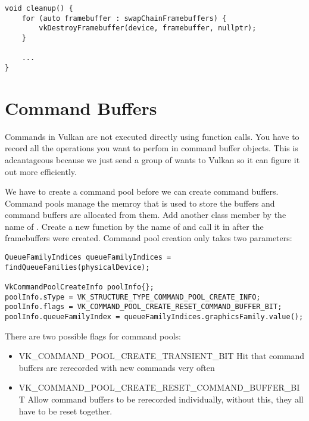  \begin{center}
\begin{minipage}{0.95\linewidth}
\begin{lstlisting}
void cleanup() {
    for (auto framebuffer : swapChainFramebuffers) {
        vkDestroyFramebuffer(device, framebuffer, nullptr);
    }

    ...
}
\end{lstlisting}
\end{minipage}
\end{center}

\section*{Command Buffers}

\par Commands in Vulkan are not executed directly using function calls. You have to record all the operations you want to perfom in command buffer objects. This is adcantageous because we just send a group of wants to Vulkan so it can figure it out more efficiently.

\par We have to create a command pool before we can create command buffers. Command pools manage the memroy that is used to store the buffers and command buffers are allocated from them. Add another class member by the name of . Create a new function by the name of  and call it in  after the framebuffers were created. Command pool creation only takes two parameters:

\begin{center}
\begin{minipage}{0.95\linewidth}
\begin{lstlisting}
QueueFamilyIndices queueFamilyIndices = findQueueFamilies(physicalDevice);

VkCommandPoolCreateInfo poolInfo{};
poolInfo.sType = VK_STRUCTURE_TYPE_COMMAND_POOL_CREATE_INFO;
poolInfo.flags = VK_COMMAND_POOL_CREATE_RESET_COMMAND_BUFFER_BIT;
poolInfo.queueFamilyIndex = queueFamilyIndices.graphicsFamily.value();
\end{lstlisting}
\end{minipage}
\end{center}

\par There are two possible flags for command pools:

\begin{itemize}
\item {VK\_COMMAND\_POOL\_CREATE\_TRANSIENT\_BIT} Hit that command buffers are rerecorded with new commands very often
\item {VK\_COMMAND\_POOL\_CREATE\_RESET\_COMMAND\_BUFFER\_BIT} Allow command buffers to be rerecorded individually, without this, they all have to be reset together.
\end{itemize}

